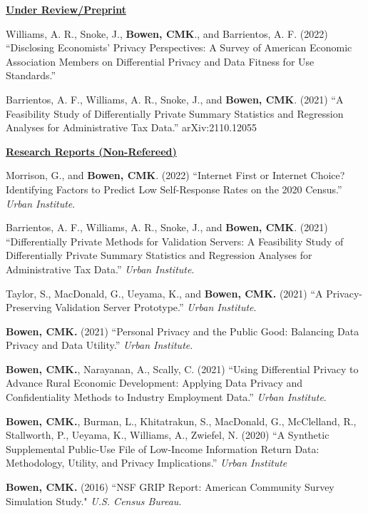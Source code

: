 \documentclass[11pt, letterpaper, roman]{moderncv} %
\begin{document}
\vspace{4pt}
\noindent\underline{\textbf{Under Review/Preprint}}
\begin{etaremune}[topsep=0pt, itemsep=4pt, partopsep=0pt, parsep=0pt]
    \item Williams, A. R., Snoke, J., \textbf{Bowen, CMK}., and Barrientos, A. F. (2022) ``Disclosing Economists' Privacy Perspectives: A Survey of American Economic Association Members on Differential Privacy and Data Fitness for Use Standards.''
    
    \item Barrientos, A. F., Williams, A. R., Snoke, J., and \textbf{Bowen, CMK}. (2021) ``A Feasibility Study of Differentially Private Summary Statistics and Regression Analyses for Administrative Tax Data.'' arXiv:2110.12055
\end{etaremune}

\vspace{4pt}
\noindent\underline{\textbf{Research Reports (Non-Refereed)}}
\vspace{4pt}
\begin{etaremune}[topsep=0pt, itemsep=3pt, partopsep=0pt, parsep=0pt]
    \item Morrison, G., and \textbf{Bowen, CMK}. (2022) ``Internet First or Internet Choice? Identifying Factors to Predict Low Self-Response Rates on the 2020 Census.'' \textit{Urban Institute}.
    
    \item Barrientos, A. F., Williams, A. R., Snoke, J., and \textbf{Bowen, CMK}. (2021) ``Differentially Private Methods for Validation Servers: A Feasibility Study of Differentially Private Summary Statistics and Regression Analyses for Administrative Tax Data.'' \textit{Urban Institute}.
    
    \item Taylor, S., MacDonald, G., Ueyama, K., and \textbf{Bowen, CMK.} (2021) ``A Privacy-Preserving Validation Server Prototype.'' \textit{Urban Institute}.
        
    \item \textbf{Bowen, CMK.} (2021) ``Personal Privacy and the Public Good: Balancing Data Privacy and Data Utility.'' \textit{Urban Institute}.
    
    \item \textbf{Bowen, CMK.}, Narayanan, A., Scally, C. (2021) ``Using Differential Privacy to Advance Rural Economic Development: Applying Data Privacy and Confidentiality Methods to Industry Employment Data.'' \textit{Urban Institute}.
    
    \item \textbf{Bowen, CMK.}, Burman, L., Khitatrakun, S., MacDonald, G., McClelland, R., Stallworth, P., Ueyama, K., Williams, A., Zwiefel, N. (2020) ``A Synthetic Supplemental Public-Use File of Low-Income Information Return Data: Methodology, Utility, and Privacy Implications.'' \textit{Urban Institute}
    
    \item \textbf{Bowen, CMK.} (2016) ``NSF GRIP Report: American Community Survey Simulation Study." \textit{U.S. Census Bureau}.  
\end{etaremune}
\end{document}
